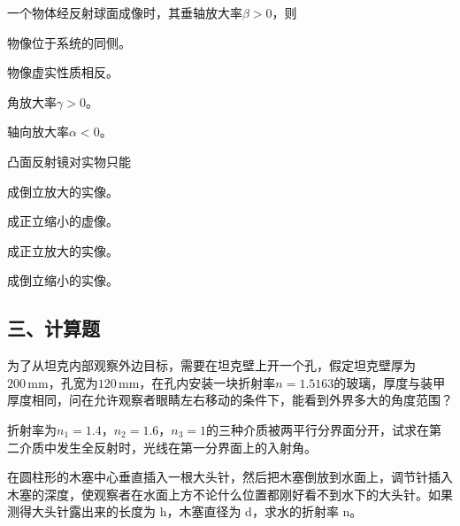 \documentclass[padl, analysis, notocnum]{ExBook}
\newcommand{\answerarea}[1][3.5cm]{%
  \par\vspace{1mm}%
  \noindent{\color{themeColor!35}\rule{\linewidth}{0.4pt}}\par
  \noindent\begin{minipage}[t][#1][t]{\linewidth}\vspace{0pt}\end{minipage}\par
  \noindent{\color{themeColor!35}\rule{\linewidth}{0.4pt}}\par
}
\begin{document}
\begin{qitems}[startnum=6]
\qitem 一个物体经反射球面成像时，其垂轴放大率$\beta >0$，则
\par\noindent\hspace{2em}物像位于系统的同侧。
\par\noindent\hspace{2em}物像虚实性质相反。
\par\noindent\hspace{2em}角放大率$\gamma >0$。
\par\noindent\hspace{2em}轴向放大率$\alpha <0$。
\label{q:6:start}
\answerarea[4.0cm]
\label{q:6:end}
\end{qitems}

\begin{qitems}[startnum=7]
\qitem 凸面反射镜对实物只能
\par\noindent\hspace{2em}成倒立放大的实像。
\par\noindent\hspace{2em}成正立缩小的虚像。
\par\noindent\hspace{2em}成正立放大的实像。
\par\noindent\hspace{2em}成倒立缩小的实像。
\label{q:7:start}
\answerarea[4.0cm]
\label{q:7:end}
\end{qitems}

\subsection{三、计算题}
\begin{qitems}[startnum=1]
\qitem 为了从坦克内部观察外边目标，需要在坦克壁上开一个孔，假定坦克壁厚为$200\,\mathrm{mm}$，孔宽为$120\,\mathrm{mm}$，在孔内安装一块折射率$n=1.5163$的玻璃，厚度与装甲厚度相同，问在允许观察者眼睛左右移动的条件下，能看到外界多大的角度范围？
\label{q:8:start}
\answerarea[7.0cm]
\label{q:8:end}
\end{qitems}

\begin{qitems}[startnum=2]
\qitem 折射率为$n_{1}=1.4$，$n_{2}=1.6$，$n_{3}=1$的三种介质被两平行分界面分开，试求在第二介质中发生全反射时，光线在第一分界面上的入射角。
\label{q:9:start}
\answerarea[7.0cm]
\label{q:9:end}
\end{qitems}

\begin{qitems}[startnum=3]
\qitem 在圆柱形的木塞中心垂直插入一根大头针，然后把木塞倒放到水面上，调节针插入木塞的深度，使观察者在水面上方不论什么位置都刚好看不到水下的大头针。如果测得大头针露出来的长度为 h，木塞直径为 d，求水的折射率 n。
\label{q:10:start}
\answerarea[7.0cm]
\label{q:10:end}
\end{qitems}
\end{document}
